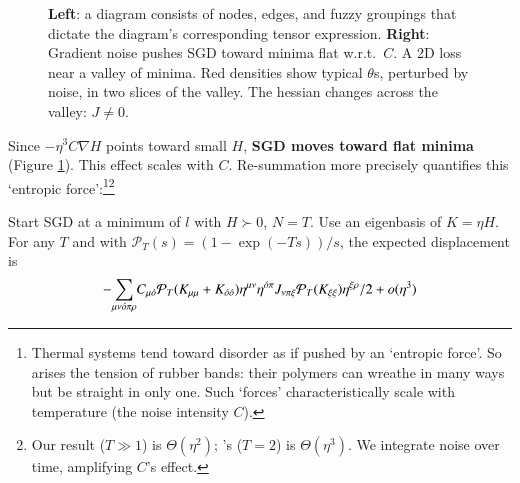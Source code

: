 \begin{figure}%
    \centering
    \caption{%
        \textbf{Left}:
        a diagram consists of nodes,
                  edges, and fuzzy groupings that dictate the diagram's
                  corresponding tensor expression.
        \textbf{Right}:         %
        Gradient noise pushes SGD toward minima flat w.r.t.\ $C$.
            A 2D loss near
            a valley of minima.  Red densities show typical
            $\theta$s, perturbed by noise,
            in two slices of the valley.  The hessian
            changes across the valley: $J \neq 0$.  
    }
    \label{fig:cubic}
\end{figure}
Since $-\eta^3 C\nabla H$ points toward small $H$, \textbf{SGD moves
toward flat minima} (Figure \ref{fig:cubic}).
This effect scales with $C$.  
%
%
Re-summation more precisely quantifies this `entropic force':\footnote{
    Thermal systems tend toward disorder as if pushed by an
    `entropic force'.
    So arises the tension of rubber
    bands: their polymers can wreathe in
    many ways but be straight in only one.
    Such `forces' characteristically 
    scale with
    temperature (the noise intensity $C$).
}\footnote{
    Our result ($T\gg 1$) is $\Theta(\eta^2)$; \cite{ya19b}'s
    ($T=2$) is $\Theta(\eta^3)$.  We
    integrate noise over time, amplifying $C$'s
    effect. 
}
%
\begin{cor}\label{cor:entropic}%
    Start SGD at a minimum of $l$ with $H\succ 0$, $N=T$.  Use
    an eigenbasis of $K=\eta H$.  
    For any $T$ and
    with ${\mathcal P}_T(s) = (1 - \exp(-Ts))/s$,
    the 
    expected displacement is
    $$
        -
        {\sum_{\mu\nu   {\acute{o}}\pi\rho}}
            C_{\mu{\acute{o}}}
            {{\mathcal P}_T(K_{\mu\mu} + K_{{\acute{o}}{\acute{o}}})}
            \eta^{\mu\nu}\eta^{{\acute{o}}\pi}
            J_{\nu\pi\xi}
            {{\mathcal P}_T(K_{\xi\xi})}\eta^{\xi\rho}/2
        + o(\eta^3)
    $$
\end{cor}

